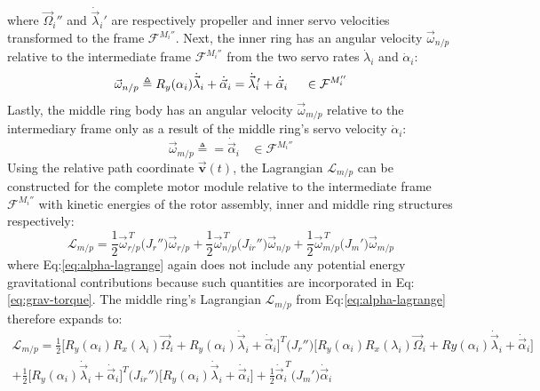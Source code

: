 where $\vec{\Omega}_i''$ and $\dot{\vec{\lambda}}_i'$ are respectively propeller and inner servo velocities transformed to the frame $\mathcal{F}^{M_i''}$. Next, the inner ring has an angular velocity $\vec{\omega}_{n/p}$ relative to the intermediate frame $\mathcal{F}^{M_i''}$ from the two servo rates $\dot{\lambda}_i$ and $\dot{\alpha}_i$:
\begin{equation}\label{eq:inner-relative}
\vec{\omega}_{n/p}\triangleq R_y(\alpha_i)\dot{\vec{\lambda}}_i+\dot{\vec{\alpha}}_i=\dot{\vec{\lambda}}_i\text{}\hspace{-2pt}'+\dot{\vec{\alpha}}_i~~~~\in\mathcal{F}^{M_i''}
\end{equation}
Lastly, the middle ring body has an angular velocity $\vec{\omega}_{m/p}$ relative to the intermediary frame only as a result of the middle ring's servo velocity $\dot{\alpha}_i$:
\begin{equation}\label{eq:middle-relative}
\vec{\omega}_{m/p}\triangleq=\dot{\vec{\alpha}}_i~~~~\in\mathcal{F}^{M_i''}
\end{equation}
Using the relative path coordinate $\vec{\mathbf{v}}(t)$, the Lagrangian $\mathcal{L}_{m/p}$ can be constructed for the complete motor module relative to the intermediate frame $\mathcal{F}^{M_i''}$ with kinetic energies of the rotor assembly, inner and middle ring structures respectively:
\begin{equation}\label{eq:alpha-lagrange}
\mathcal{L}_{m/p}=\frac{1}{2}\vec{\omega}_{r/p}^{\hspace{2pt}T}\big(J_{r}''\big)\vec{\omega}_{r/p}+\frac{1}{2}\vec{\omega}_{n/p}^{\hspace{2pt}T}\big(J_{ir}''\big)\vec{\omega}_{n/p}+\frac{1}{2}\vec{\omega}_{m/p}^{\hspace{2pt}T}\big(J_{m}'\big)\vec{\omega}_{m/p}
\end{equation}
where Eq:\ref{eq:alpha-lagrange} again does not include any potential energy gravitational contributions because such quantities are incorporated in Eq:\ref{eq:grav-torque}. The middle ring's Lagrangian $\mathcal{L}_{m/p}$ from Eq:\ref{eq:alpha-lagrange} therefore expands to:
\begin{multline}\label{eq:alpha-lagrange-two}
\mathcal{L}_{m/p}=\frac{1}{2}\Big[R_y(\alpha_i)R_x(\lambda_i)\vec{\Omega}_i+R_y(\alpha_i)\dot{\vec{\lambda}}_i+\dot{\vec{\alpha}}_i\Big]^T\big(J_r''\big)\Big[R_y(\alpha_i)R_x(\lambda_i)\vec{\Omega}_i+Ry(\alpha_i)\dot{\vec{\lambda}}_i+\dot{\vec{\alpha}}_i\Big]\\
+\frac{1}{2}\Big[R_y(\alpha_i)\dot{\vec{\lambda}}_i+\dot{\vec{\alpha}}_i\Big]^T\big(J_{ir}''\big)\Big[R_y(\alpha_i)\dot{\vec{\lambda}}_i+\dot{\vec{\alpha}}_i\Big]
+\frac{1}{2}\dot{\vec{\alpha}}_i^{\hspace{2pt}T}\big(J_m'\big)\dot{\vec{\alpha}}_i
\end{multline}
